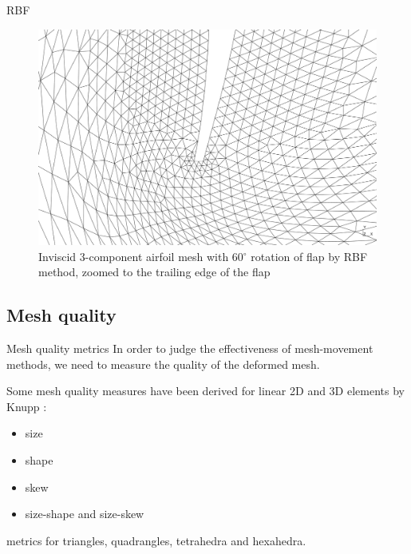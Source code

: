 \documentclass[t,12pt]{beamer}
\begin{document}
\begin{frame}{RBF}
\begin{figure}
	\centering
	\includegraphics[scale=0.17]{wing60-rbf-sr15-s3_zoomed2}
	\caption{Inviscid 3-component airfoil mesh with 60$^\circ$ rotation of flap by RBF method, zoomed to the trailing edge of the flap}
	\label{fig:wing-inviscid-rbf-zoomed2}
\end{figure}
\end{frame}

\subsection{Mesh quality}
\begin{frame}{Mesh quality metrics}
In order to judge the effectiveness of mesh-movement methods, we need to measure the quality of the deformed mesh.

Some mesh quality measures have been derived for linear 2D and 3D elements by Knupp : 
\begin{itemize}
\item size 
\item shape 
\item skew 
\item size-shape and size-skew 
\end{itemize}
metrics for triangles, quadrangles, tetrahedra and hexahedra.
\end{frame}
\end{document}
